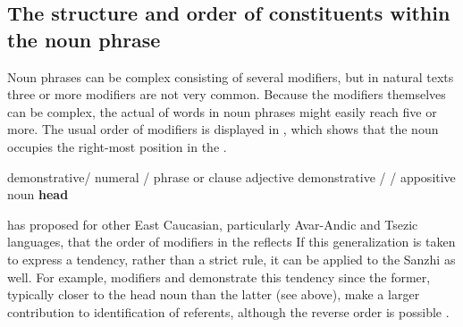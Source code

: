 
\subsection{The structure and order of constituents within the noun phrase}
\label{ssec:The structure and order of constituents within the noun phrase}

Noun phrases can be complex consisting of several modifiers, but in natural texts three or more modifiers are not very common. Because the modifiers themselves can be complex, the actual  of words in noun phrases might easily reach five or more. The usual order of modifiers is displayed in , which shows that the noun occupies the right-most position in the .
%
\begin{exe}
	\ex	 demonstrative\slash {}	\newline\hspace*{1.5em}	numeral / 	\newline\hspace*{3.0em}	phrase or clause	\newline\hspace*{4.5em}	adjective	\newline\hspace*{6.0em}	demonstrative /  / 	\newline\hspace*{7.5em}	appositive noun	\newline\hspace*{9.0em}	\textbf{head} 	\label{ex:Modifiers and their order in the NP}
\end{exe}

\citet[654]{Testelec1998a} has proposed for other East Caucasian, particularly Avar-Andic and Tsezic languages, that the order of modifiers in the  reflects  If this generalization is taken to express a tendency, rather than a strict rule, it can be applied to the Sanzhi  as well. For example,  modifiers and  demonstrate this tendency since the former, typically closer to the head noun than the latter (see  above), make a larger contribution to identification of referents, although the reverse order is possible .

